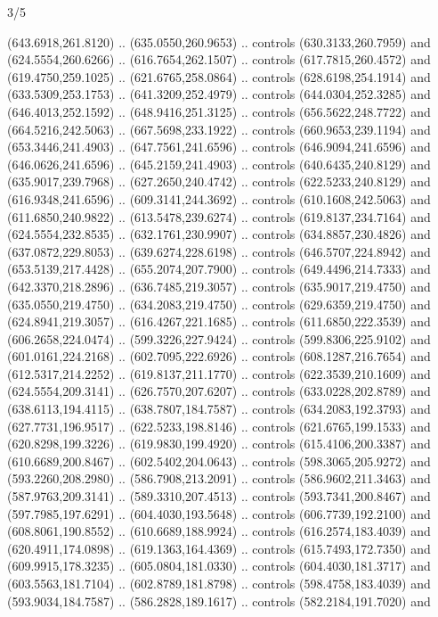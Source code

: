 \begin{flagdescription}{3/5}
\begin{scope}[xshift=0.5\flaglength]
\begin{scope}[scale=0.00167\flagwidth,yshift=210.9mm,xshift=-175.8mm]
\begin{scope}[y=-1pt, x=1pt]
  (643.6918,261.8120) .. (635.0550,260.9653) .. controls (630.3133,260.7959) and
  (624.5554,260.6266) .. (616.7654,262.1507) .. controls (617.7815,260.4572) and
  (619.4750,259.1025) .. (621.6765,258.0864) .. controls (628.6198,254.1914) and
  (633.5309,253.1753) .. (641.3209,252.4979) .. controls (644.0304,252.3285) and
  (646.4013,252.1592) .. (648.9416,251.3125) .. controls (656.5622,248.7722) and
  (664.5216,242.5063) .. (667.5698,233.1922) .. controls (660.9653,239.1194) and
  (653.3446,241.4903) .. (647.7561,241.6596) .. controls (646.9094,241.6596) and
  (646.0626,241.6596) .. (645.2159,241.4903) .. controls (640.6435,240.8129) and
  (635.9017,239.7968) .. (627.2650,240.4742) .. controls (622.5233,240.8129) and
  (616.9348,241.6596) .. (609.3141,244.3692) .. controls (610.1608,242.5063) and
  (611.6850,240.9822) .. (613.5478,239.6274) .. controls (619.8137,234.7164) and
  (624.5554,232.8535) .. (632.1761,230.9907) .. controls (634.8857,230.4826) and
  (637.0872,229.8053) .. (639.6274,228.6198) .. controls (646.5707,224.8942) and
  (653.5139,217.4428) .. (655.2074,207.7900) .. controls (649.4496,214.7333) and
  (642.3370,218.2896) .. (636.7485,219.3057) .. controls (635.9017,219.4750) and
  (635.0550,219.4750) .. (634.2083,219.4750) .. controls (629.6359,219.4750) and
  (624.8941,219.3057) .. (616.4267,221.1685) .. controls (611.6850,222.3539) and
  (606.2658,224.0474) .. (599.3226,227.9424) .. controls (599.8306,225.9102) and
  (601.0161,224.2168) .. (602.7095,222.6926) .. controls (608.1287,216.7654) and
  (612.5317,214.2252) .. (619.8137,211.1770) .. controls (622.3539,210.1609) and
  (624.5554,209.3141) .. (626.7570,207.6207) .. controls (633.0228,202.8789) and
  (638.6113,194.4115) .. (638.7807,184.7587) .. controls (634.2083,192.3793) and
  (627.7731,196.9517) .. (622.5233,198.8146) .. controls (621.6765,199.1533) and
  (620.8298,199.3226) .. (619.9830,199.4920) .. controls (615.4106,200.3387) and
  (610.6689,200.8467) .. (602.5402,204.0643) .. controls (598.3065,205.9272) and
  (593.2260,208.2980) .. (586.7908,213.2091) .. controls (586.9602,211.3463) and
  (587.9763,209.3141) .. (589.3310,207.4513) .. controls (593.7341,200.8467) and
  (597.7985,197.6291) .. (604.4030,193.5648) .. controls (606.7739,192.2100) and
  (608.8061,190.8552) .. (610.6689,188.9924) .. controls (616.2574,183.4039) and
  (620.4911,174.0898) .. (619.1363,164.4369) .. controls (615.7493,172.7350) and
  (609.9915,178.3235) .. (605.0804,181.0330) .. controls (604.4030,181.3717) and
  (603.5563,181.7104) .. (602.8789,181.8798) .. controls (598.4758,183.4039) and
  (593.9034,184.7587) .. (586.2828,189.1617) .. controls (582.2184,191.7020) and

\end{scope}
\end{scope}
\end{scope}
\end{flagdescription}
